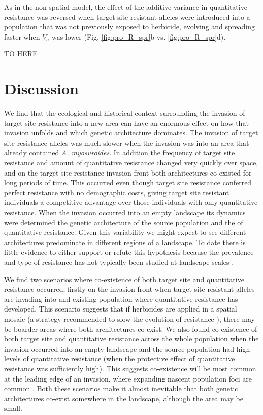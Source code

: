 \documentclass[10pt,letterpaper]{article}
\begin{document}
As in the non-spatial model, the effect of the additive variance in quantitative resistance was reversed when target site resistant alleles were introduced into a population that was not previously exposed to herbicide, evolving and spreading faster when $V_a$ was lower (Fig. \ref{fig:pro_R_spr}b vs. \ref{fig:pro_R_spr}d).             



TO HERE

\section*{Discussion}
We find that the ecological and historical context surrounding the invasion of target site resistance into a new area can have an enormous effect on how that invasion unfolds and which genetic architecture dominates. The invasion of target site resistance alleles was much slower when the invasion was into an area that already contained \textit{A. myosuroides}. In addition the frequency of target site resistance and amount of quantitative resistance changed very quickly over space, and on the target site resistance invasion front both architectures co-existed for long periods of time. This occurred even though target site resistance conferred perfect resistance with no demographic costs, giving target site resistant individuals a competitive advantage over those individuals with only quantitative resistance. When the invasion occurred into an empty landscape its dynamics were determined the genetic architecture of the source population and the of quantitative resistance. Given this variability we might expect to see different architectures predominate in different regions of a landscape. To date there is little evidence to either support or refute this hypothesis because the prevalence and type of resistance has not typically been studied at landscape scales \cite{Dely2013}.

We find two scenarios where co-existence of both target site and quantitative resistance occurred; firstly on the invasion front when target site resistant alleles are invading into and existing population where quantitative resistance has developed. This scenario suggests that if herbicides are applied in a spatial mosaic (a strategy recommended to slow the evolution of resistance \cite{Rex2013}), there may be boarder areas where both architectures co-exist. We also found co-existence of both target site and quantitative resistance across the whole population when the invasion occurred into an empty landscape and the source population had high levels of quantitative resistance (when the protective effect of quantitative resistance was sufficiently high). This suggests co-existence will be most common at the leading edge of an invasion, where expanding nascent population foci are common \cite{Mooy1988}. Both these scenarios make it almost inevitable that both genetic architectures co-exist somewhere in the landscape, although the area may be small.
\end{document}
